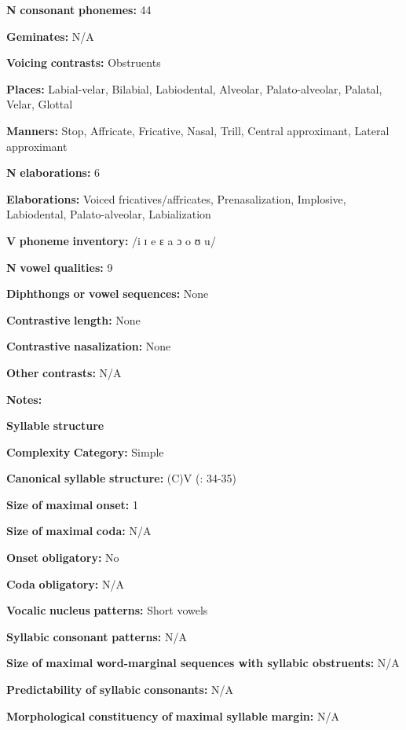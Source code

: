 \begin{styleBody}
\textbf{N} \textbf{consonant} \textbf{phonemes:} 44

\textbf{Geminates:} N/A

\textbf{Voicing} \textbf{contrasts:} Obstruents

\textbf{Places:} Labial-velar, Bilabial, Labiodental, Alveolar, Palato-alveolar, Palatal, Velar, Glottal

\textbf{Manners:} Stop, Affricate, Fricative, Nasal, Trill, Central approximant, Lateral approximant

\textbf{N} \textbf{elaborations:} 6

\textbf{Elaborations:} Voiced fricatives/affricates, Prenasalization, Implosive, Labiodental, Palato-alveolar, Labialization

\textbf{V} \textbf{phoneme} \textbf{inventory:} /i ɪ e ɛ a ɔ o ʊ u/

\textbf{N} \textbf{vowel} \textbf{qualities:} 9

\textbf{Diphthongs} \textbf{or} \textbf{vowel} \textbf{sequences:} None

\textbf{Contrastive} \textbf{length:} None

\textbf{Contrastive} \textbf{nasalization:} None

\textbf{Other} \textbf{contrasts:} N/A

\textbf{Notes:}

\textbf{Syllable} \textbf{structure}

\textbf{Complexity} \textbf{Category:} Simple

\textbf{Canonical} \textbf{syllable} \textbf{structure:} (C)V (\citealt{BlackingsFabb2003}: 34-35)

\textbf{Size} \textbf{of} \textbf{maximal} \textbf{onset:} 1

\textbf{Size} \textbf{of} \textbf{maximal} \textbf{coda:} N/A

\textbf{Onset} \textbf{obligatory:} No

\textbf{Coda} \textbf{obligatory:} N/A

\textbf{Vocalic} \textbf{nucleus} \textbf{patterns:} Short vowels

\textbf{Syllabic} \textbf{consonant} \textbf{patterns:} N/A

\textbf{Size} \textbf{of} \textbf{maximal} \textbf{word{}-marginal sequences with syllabic obstruents:} N/A

\textbf{Predictability} \textbf{of} \textbf{syllabic} \textbf{consonants:} N/A

\textbf{Morphological} \textbf{constituency} \textbf{of} \textbf{maximal} \textbf{syllable} \textbf{margin:} N/A


\end{styleBody}
